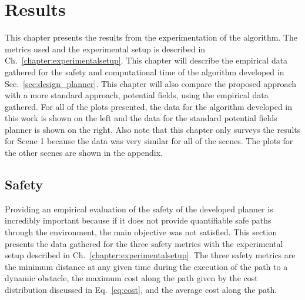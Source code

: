 


\chapter{Results}

\label{chapter:results}

This chapter presents the results from the experimentation of the algorithm.
The metrics used and the experimental setup is described in
Ch.~\ref{chapter:experimentalsetup}. This chapter will describe the empirical
data gathered for the safety and computational time of the algorithm developed
in Sec.~\ref{sec:design_planner}. This chapter will also compare the proposed
approach with a more standard approach, potential fields, using the empirical
data gathered. For all of the plots presented, the data for the algorithm
developed in this work is shown on the left and the data for the standard
potential fields planner is shown on the right. Also note that this chapter
only surveys the results for Scene 1 because the data was very similar for all
of the scenes. The plots for the other scenes are shown in the appendix.

\section{Safety}

Providing an empirical evaluation of the safety of the developed planner is
incredibly important because if it does not provide quantifiable safe paths
through the environment, the main objective was not satisfied. This section
presents the data gathered for the three safety metrics with the experimental
setup described in Ch.~\ref{chapter:experimentalsetup}. The three safety
metrics are the minimum distance at any given time during the execution of the
path to a dynamic obstacle, the maximum cost along the path given by the cost
distribution discussed in Eq.~\ref{eq:cost}, and the average cost along the
path.

